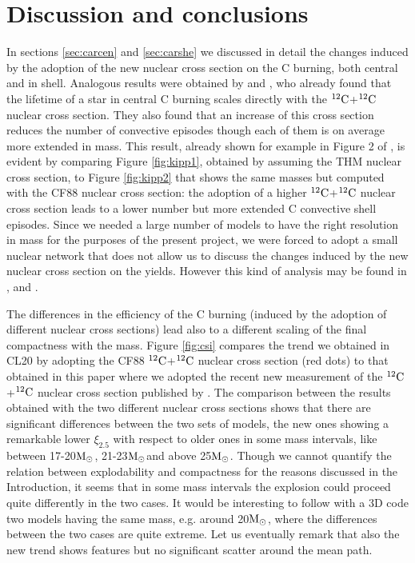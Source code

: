 \documentclass{aastex631}
\newcommand{\msun}{$\rm M_\odot$}
\newcommand\nuk[2]{$\rm ^{\rm #2} #1$}
\begin{document}
\section{Discussion and conclusions}

In sections \ref{sec:carcen} and  \ref{sec:carshe} we discussed in detail the changes induced by the adoption of the new nuclear cross section on the C burning, both central and in shell. Analogous results were obtained by \cite{be12} and \cite{pi13}, who already found that the lifetime of a star in central C burning scales directly with the \nuk{C}{12}+\nuk{C}{12} nuclear cross section. They also found that an increase of this cross section reduces the number of convective episodes though each of them is on average more extended in mass. This result, already shown for example in Figure 2 of \cite{pi13}, is evident by comparing Figure \ref{fig:kipp1}, obtained by assuming the THM nuclear cross section, to Figure \ref{fig:kipp2} that shows the same masses but computed with the CF88 nuclear cross section: the adoption of a higher \nuk{C}{12}+\nuk{C}{12} nuclear cross section leads to a lower number but more extended C convective shell episodes. Since we needed a large number of models to have the right resolution in mass for the purposes of the present project, we were forced to adopt a small nuclear network that does not allow us to discuss the changes induced by the new nuclear cross section on the yields. However this kind of analysis may be found in \cite{ga07}, \cite{be12} and \cite{pi13}.

The differences in the efficiency of the C burning (induced by the adoption of different nuclear cross sections) lead also to a different scaling of the final compactness with the mass. Figure \ref{fig:csi} compares the trend we obtained in CL20 by adopting the CF88 \nuk{C}{12}+\nuk{C}{12} nuclear cross section (red dots) to that obtained in this paper where we adopted the recent new measurement of the \nuk{C}{12}+\nuk{C}{12} nuclear cross section published by \cite{thm18}. The comparison between the results obtained with the two different nuclear cross sections shows that there are significant differences between the two sets of models, the new ones showing a remarkable lower $\xi_{2.5}$ with respect to older ones in some mass intervals, like between 17-20\msun, 21-23\msun and above 25\msun. Though we cannot quantify the relation between explodability and compactness for the reasons discussed in the Introduction, it seems that in some mass intervals the explosion could proceed quite differently in the two cases. It would be interesting to follow with a 3D code two models having the same mass, e.g. around 20\msun, where the differences between the two cases are quite extreme. Let us eventually remark that also the new trend shows features but no significant scatter around the mean path.
\end{document}
